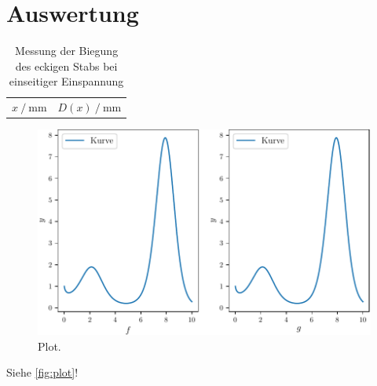 \section{Auswertung}
\label{sec:Auswertung}

\begin{table}
  \centering
  \caption{Messung der Biegung des eckigen Stabs bei einseitiger Einspannung}
  \label{tab:ecks}
  \begin{tabular}{S[tableformat=4.0] S[tableformat=4.0]}
    \toprule
    {$x\mathbin{/}\si{\milli\meter}$} & {$D(x)\mathbin{/}\si{\milli\meter}$}
  \end{tabular}
\end{table}

\begin{figure}
  \centering
  \includegraphics{plot.pdf}
  \caption{Plot.}
  \label{fig:plot}
\end{figure}


Siehe \autoref{fig:plot}!
